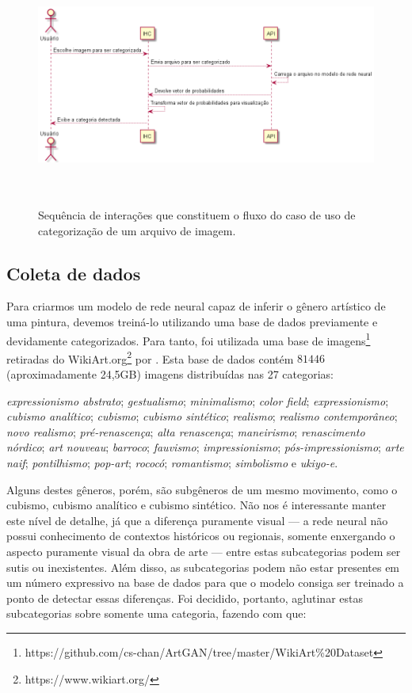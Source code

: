 \documentclass[12pt, a4paper]{article}
\begin{document}
\begin{figure}[H]
	\centering
	\includegraphics[width=\textwidth, height=8cm, keepaspectratio=true]{diagrams/sequence/Seq}
	\caption{Sequência de interações que constituem o fluxo do caso de uso de categorização de um arquivo de imagem.}
\end{figure}

\subsection{Coleta de dados}
Para criarmos um modelo de rede neural capaz de inferir o gênero artístico de uma pintura, devemos treiná-lo utilizando uma base de dados previamente e devidamente categorizados. Para tanto, foi utilizada uma base de imagens\footnote{https://github.com/cs-chan/ArtGAN/tree/master/WikiArt\%20Dataset} retiradas do WikiArt.org\footnote{https://www.wikiart.org/} por \cite{icip2016}. Esta base de dados contém $81446$ (aproximadamente 24,5GB) imagens distribuídas nas 27 categorias: 

\bigskip
\emph{expressionismo abstrato}; 
\emph{gestualismo}; 
\emph{minimalismo}; 
\emph{color field}; 
\emph{expressionismo}; 
\emph{cubismo analítico}; 
\emph{cubismo}; 
\emph{cubismo sintético}; 
\emph{realismo}; 
\emph{realismo contemporâneo}; 
\emph{novo realismo}; 
\emph{pré-renascença}; 
\emph{alta renascença}; 
\emph{maneirismo}; 
\emph{renascimento nórdico}; 
\emph{art nouveau}; 
\emph{barroco}; 
\emph{fauvismo}; 
\emph{impressionismo}; 
\emph{pós-impressionismo}; 
\emph{arte naif}; 
\emph{pontilhismo}; 
\emph{pop-art}; 
\emph{rococó}; 
\emph{romantismo}; 
\emph{simbolismo} e
\emph{ukiyo-e}.
\bigskip

Alguns destes gêneros, porém, são subgêneros de um mesmo movimento, como o cubismo, cubismo analítico e cubismo sintético. Não nos é interessante manter este nível de detalhe, já que a diferença puramente visual --- a rede neural não possui conhecimento de contextos históricos ou regionais, somente enxergando o aspecto puramente visual da obra de arte --- entre estas subcategorias podem ser sutis ou inexistentes. Além disso, as subcategorias podem não estar presentes em um número expressivo na base de dados para que o modelo consiga ser treinado a ponto de detectar essas diferenças. Foi decidido, portanto, aglutinar estas subcategorias sobre somente uma categoria, fazendo com que:
\end{document}
